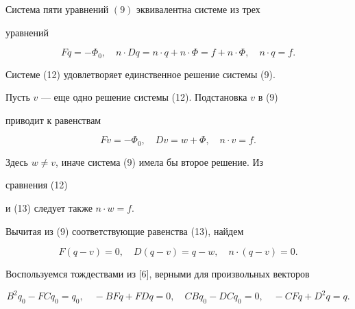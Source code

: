  


\begin{thm} 


Система пяти уравнений $(9)$ эквивалентна системе из трех  


уравнений 


\begin{equation} 


F q=-\Phi_0,\quad n\cdot D q=n\cdot q+n\cdot\Phi= 


f+n\cdot\Phi,\quad n\cdot q=f. 


\end{equation} 


\end{thm} 


 


\begin{pf}  


Системе (12) удовлетворяет единственное решение системы (9).  


Пусть $v$ --- еще одно решение системы (12). Подстановка $v$ в (9) 


приводит к равенствам 


\begin{equation} 


F v=-\Phi_0,\quad D v=w+\Phi,\quad n\cdot v=f. 


\end{equation} 


Здесь $w\ne v$, иначе система (9) имела бы второе решение. Из 


сравнения (12)  


и (13) следует также $n\cdot w=f$. 


Вычитая из (9) соответствующие равенства (13), найдем 


\begin{equation} 


F(q-v)=0,\quad D(q-v)=q-w,\quad n\cdot(q-v)=0. 


\end{equation} 


 


Воспользуемся тождествами из [6], верными для произвольных векторов 


\begin{equation} 


B^2q_0-F C q_0=q_0,\quad 


-B F q+F D q=0,\quad C B q_0-D C q_0=0,\quad 


-C F q+D^2q=q. 



\end{equation}
\end{pf}
